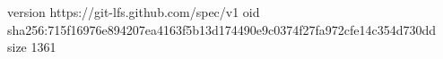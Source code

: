 version https://git-lfs.github.com/spec/v1
oid sha256:715f16976e894207ea4163f5b13d174490e9c0374f27fa972cfe14c354d730dd
size 1361
